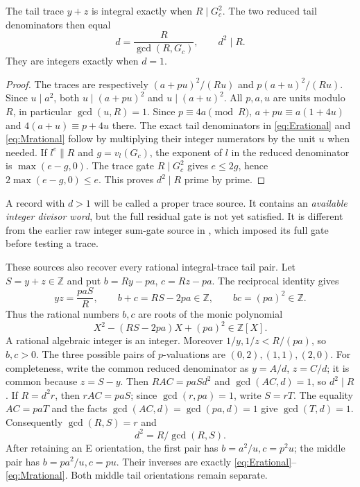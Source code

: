 \begin{lemma}\label{lem:trace}
The tail trace $y+z$ is integral exactly when $R\mid G_c^2$.
The two reduced tail denominators then equal
\begin{equation}\label{eq:d}
 d=\frac R{\gcd(R,G_c)},\qquad d^2\mid R.
\end{equation}
They are integers exactly when $d=1$.
\end{lemma}
\begin{proof}
The traces are respectively $(a+pu)^2/(Ru)$ and $p(a+u)^2/(Ru)$.
Since $u\mid a^2$, both $u\mid(a+pu)^2$ and $u\mid(a+u)^2$.
All $p,a,u$ are units modulo $R$, in particular $\gcd(u,R)=1$.
Since $p\equiv4a\pmod R$,
$a+pu\equiv a(1+4u)$ and $4(a+u)\equiv p+4u$ there.
The exact tail denominators in \eqref{eq:Erational} and
\eqref{eq:Mrational} follow by multiplying their integer numerators by the
unit $u$ when needed.  If $l^e\parallel R$ and $g=v_l(G_c)$, the exponent
of $l$ in the reduced denominator is $\max(e-g,0)$.  The trace gate
$R\mid G_c^2$ gives $e\le2g$, hence
$2\max(e-g,0)\le e$.  This proves $d^2\mid R$ prime by prime.
\end{proof}
A record with $d>1$ will be called a proper trace source. It contains an
\emph{available integer divisor word}, but the full residual gate is not yet
satisfied. It is different from the earlier raw integer sum-gate source in
\cite[TR7--16]{Trace}, which imposed its full gate before testing a trace.

These sources also recover every rational integral-trace tail pair.  Let
$S=y+z\in\mathbb Z$ and put $b=Ry-pa$, $c=Rz-pa$.  The reciprocal identity
gives
\[
 yz=\frac{paS}{R},\qquad b+c=RS-2pa\in\mathbb Z,
 \qquad bc=(pa)^2\in\mathbb Z.
\]
Thus the rational numbers $b,c$ are roots of the monic polynomial
\[
 X^2-(RS-2pa)X+(pa)^2\in\mathbb Z[X].
\]
A rational algebraic integer is an integer.  Moreover
$1/y,1/z<R/(pa)$, so $b,c>0$.  The three possible pairs of $p$-valuations
are $(0,2),(1,1),(2,0)$.
For completeness, write the common reduced denominator as
$y=A/d$, $z=C/d$; it is common because $z=S-y$.  Then
$RAC=paSd^2$ and $\gcd(AC,d)=1$, so $d^2\mid R$.  If $R=d^2r$, then
$rAC=paS$; since $\gcd(r,pa)=1$, write $S=rT$.  The equality
$AC=paT$ and the facts $\gcd(AC,d)=\gcd(pa,d)=1$ give $\gcd(T,d)=1$.
Consequently $\gcd(R,S)=r$ and
\[
 d^2=R/\gcd(R,S).
\]
After retaining an E orientation, the first pair has
$b=a^2/u,c=p^2u$; the middle pair has $b=pa^2/u,c=pu$.
Their inverses are exactly \eqref{eq:Erational}--\eqref{eq:Mrational}.
Both middle tail orientations remain separate.

